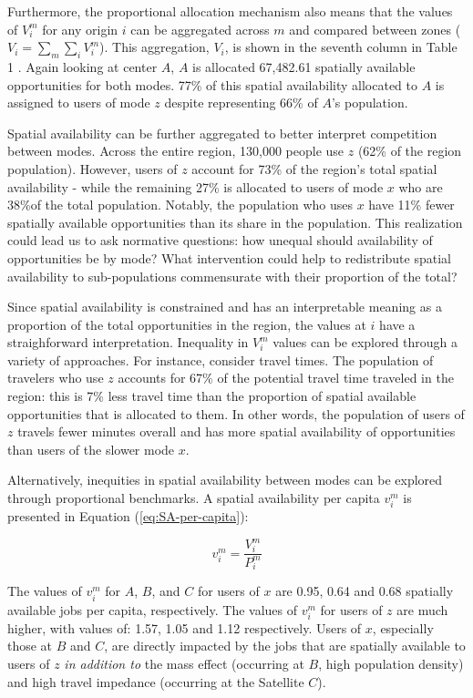 \documentclass[10pt,letterpaper]{article}
\begin{document}
Furthermore, the proportional allocation mechanism also means that the
values of \(V_i^m\) for any origin \(i\) can be aggregated across \(m\)
and compared between zones (\(V_i = \sum_m{\sum_i{V_i^m}}\)). This
aggregation, \(V_i\), is shown in the seventh column in Table 1 . Again
looking at center \(A\), \(A\) is allocated 67,482.61 spatially
available opportunities for both modes. 77\% of this spatial
availability allocated to \(A\) is assigned to users of mode \(z\)
despite representing 66\% of \(A\)'s population.

Spatial availability can be further aggregated to better interpret
competition between modes. Across the entire region, 130,000 people use
\(z\) (62\% of the region population). However, users of \(z\) account
for 73\% of the region's total spatial availability - while the
remaining 27\% is allocated to users of mode \(x\) who are 38\%of the
total population. Notably, the population who uses \(x\) have 11\% fewer
spatially available opportunities than its share in the population. This
realization could lead us to ask normative questions: how unequal should
availability of opportunities be by mode? What intervention could help
to redistribute spatial availability to sub-populations commensurate
with their proportion of the total?

Since spatial availability is constrained and has an interpretable
meaning as a proportion of the total opportunities in the region, the
values at \(i\) have a straighforward interpretation. Inequality in
\(V_i^m\) values can be explored through a variety of approaches. For
instance, consider travel times. The population of travelers who use
\(z\) accounts for 67\% of the potential travel time traveled in the
region: this is 7\% less travel time than the proportion of spatial
available opportunities that is allocated to them. In other words, the
population of users of \(z\) travels fewer minutes overall and has more
spatial availability of opportunities than users of the slower mode
\(x\).

Alternatively, inequities in spatial availability between modes can be
explored through proportional benchmarks. A spatial availability per
capita \(v_i^m\) is presented in Equation (\ref{eq:SA-per-capita}):

\begin{equation}
\label{eq:SA-per-capita}
v_{i}^m = \frac{V_{i}^m}{P_{i}^m}
\end{equation}

The values of \(v_i^m\) for \(A\), \(B\), and \(C\) for users of \(x\)
are 0.95, 0.64 and 0.68 spatially available jobs per capita,
respectively. The values of \(v_i^m\) for users of \(z\) are much
higher, with values of: 1.57, 1.05 and 1.12 respectively. Users of
\(x\), especially those at \(B\) and \(C\), are directly impacted by the
jobs that are spatially available to users of \(z\) \emph{in addition
to} the mass effect (occurring at \(B\), high population density) and
high travel impedance (occurring at the Satellite \(C\)).
\end{document}
